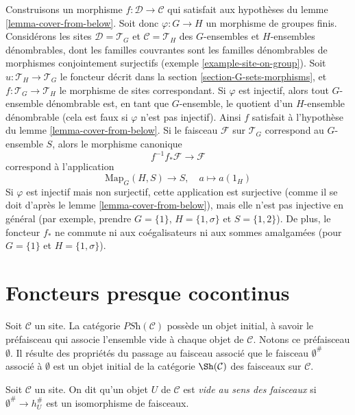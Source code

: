\begin{example}
\label{example-cover-from-below}
Construisons un morphisme $f : \mathcal{D} \to \mathcal{C}$ qui satisfait
aux hypothèses du lemme \ref{lemma-cover-from-below}. Soit donc
$\varphi : G \to H$ un morphisme de groupes finis. Considérons les sites
$\mathcal{D} = \mathcal{T}_G$ et $\mathcal{C} = \mathcal{T}_H$ des $G$-ensembles et
$H$-ensembles dénombrables, dont les familles couvrantes sont les familles dénombrables de
morphismes conjointement surjectifs (exemple \ref{example-site-on-group}).
Soit $u : \mathcal{T}_H \to \mathcal{T}_G$ le foncteur décrit
dans la section \ref{section-G-sets-morphisms},
et $f : \mathcal{T}_G \to \mathcal{T}_H$ le
morphisme de sites correspondant. Si $\varphi$ est injectif, alors
tout $G$-ensemble dénombrable est, en tant que $G$-ensemble, le quotient d’un
$H$-ensemble dénombrable (cela est faux si $\varphi$ n’est pas injectif). Ainsi $f$ satisfait
à l’hypothèse du lemme \ref{lemma-cover-from-below}.
Si le faisceau $\mathcal{F}$ sur $\mathcal{T}_G$ correspond au $G$-ensemble
$S$, alors le morphisme canonique
$$
f^{-1}f_*\mathcal{F} \longrightarrow \mathcal{F}
$$
correspond à l’application
$$
\text{Map}_G(H, S) \longrightarrow S,\quad
a \longmapsto a(1_H)
$$
Si $\varphi$ est injectif mais non surjectif, cette application est surjective
(comme il se doit d’après le lemme \ref{lemma-cover-from-below}),
mais elle n’est pas injective en général
(par exemple, prendre $G = \{1\}$, $H = \{1, \sigma\}$ et $S = \{1, 2\}$).
De plus, le foncteur $f_*$ ne commute ni aux coégalisateurs ni aux
sommes amalgamées (pour $G = \{1\}$ et $H = \{1, \sigma\}$).
\end{example}





\section{Foncteurs presque cocontinus}
\label{section-almost-cocontinuous}

\noindent
Soit $\mathcal{C}$ un site. La catégorie $\textit{PSh}(\mathcal{C})$ possède
un objet initial, à savoir le préfaisceau qui associe l’ensemble vide
à chaque objet de $\mathcal{C}$. Notons ce préfaisceau
$\emptyset$. Il résulte des propriétés du passage au faisceau associé que le
faisceau $\emptyset^\#$ associé à $\emptyset$ est un objet initial
de la catégorie $\Sh(\mathcal{C})$ des faisceaux sur $\mathcal{C}$.

\begin{definition}
\label{definition-empty}
Soit $\mathcal{C}$ un site. On dit qu’un objet $U$ de $\mathcal{C}$
est {\it vide au sens des faisceaux} si $\emptyset^\# \to h_U^\#$
est un isomorphisme de faisceaux.
\end{definition}

